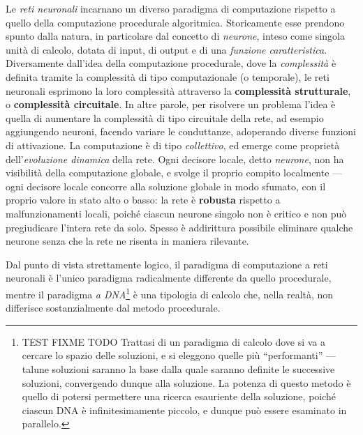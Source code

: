 \documentclass[10pt]{book}
\begin{document}
Le \emph{reti neuronali} incarnano un diverso paradigma di computazione
rispetto a quello della computazione procedurale algoritmica. Storicamente esse
prendono spunto dalla natura, in particolare dal concetto di \emph{neurone},
inteso come singola unità di calcolo, dotata di input, di output e di una
\emph{funzione caratteristica}. Diversamente dall'idea della computazione
procedurale, dove la \emph{complessità} è definita tramite la complessità di
tipo computazionale (o temporale), le reti neuronali esprimono la loro
complessità attraverso la \textbf{complessità strutturale}, o
\textbf{complessità circuitale}. In altre parole, per risolvere un problema
l'idea è quella di aumentare la complessità di tipo circuitale della rete, ad
esempio aggiungendo neuroni, facendo variare le conduttanze, adoperando diverse
funzioni di attivazione. La computazione è di tipo \emph{collettivo}, ed emerge
come proprietà dell'\emph{evoluzione dinamica} della rete. Ogni decisore
locale, detto \emph{neurone}, non ha visibilità della computazione globale, e
svolge il proprio compito localmente \---- ogni decisore locale concorre alla
soluzione globale in modo sfumato, con il proprio valore in stato alto o basso:
la rete è \textbf{robusta} rispetto a malfunzionamenti locali, poiché ciascun
neurone singolo non è critico e non può pregiudicare l'intera rete da solo.
Spesso è addirittura possibile eliminare qualche neurone senza che la rete ne
risenta in maniera rilevante.

Dal punto di vista strettamente logico, il paradigma di computazione a reti
neuronali è l'unico paradigma radicalmente differente da quello procedurale,
mentre il paradigma \emph{a DNA}\footnote{TEST FIXME TODO Trattasi di un paradigma di calcolo
dove si va a cercare lo spazio delle soluzioni, e si eleggono quelle più
``performanti'' \---- talune soluzioni saranno la base dalla quale saranno
definite le successive soluzioni, convergendo dunque alla soluzione. La potenza
di questo metodo è quello di potersi permettere una ricerca esauriente della
soluzione, poiché ciascun DNA è infinitesimamente piccolo, e dunque può essere
esaminato in parallelo.} è una tipologia di calcolo che, nella realtà, non
differisce sostanzialmente dal metodo procedurale.
\end{document}
